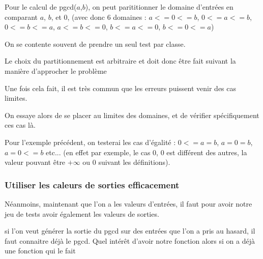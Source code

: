 \begin{example}
	Pour le calcul de pgcd($a$,$b$), on peut parititionner le domaine d'entrées en comparant $a$, $b$, et $0$, (avec donc 6 domaines : $a <= 0 <= b$, $0 <= a <= b$, $0 <= b <= a$, $a <= b <= 0$, $b <= a <= 0$, $b <= 0 <= a$)
\end{example}

\begin{rem}
	On se contente souvent de prendre un seul test par classe.
\end{rem}

\begin{rem}
	Le choix du partitionnement est arbitraire et doit donc être fait suivant la manière d'approcher le problème
\end{rem}


Une fois cela fait, il est très commun que les erreurs puissent venir des cas limites. 

\begin{principe}
	On essaye alors de se placer au limites des domaines, et de vérifier spécifiquement ces cas là.
\end{principe}

\begin{example}
	Pour l'exemple précédent, on testerai les cas d'égalité : $0 <= a = b$, $a = 0 = b$, $a  = 0 <= b$ etc... (en effet par exemple, le cas 0, 0 est différent des autres, la valeur pouvant être $+\infty$ ou $0$ suivant les définitions).
\end{example}

\subsubsection{Utiliser les caleurs de sorties efficacement}

Néanmoins, maintenant que l'on a les valeurs d'entrées, il faut pour avoir notre jeu de tests avoir également les valeurs de sorties.

\begin{example}
	si l'on veut générer la sortie du pgcd sur des entrées que l'on a pris au hasard, il faut connaitre déjà le pgcd. Quel intérêt d'avoir notre fonction alors si on a déjà une fonction qui le fait
\end{example}

